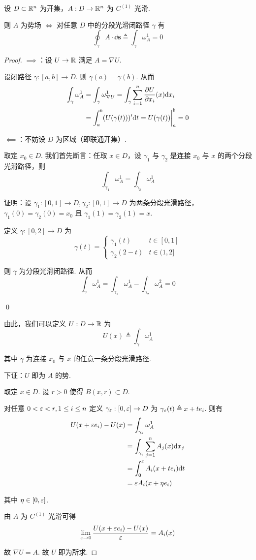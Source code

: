 \begin{property}
    设 $D\subset\mathbb{R}^n$ 为开集，$A:D\to\mathbb{R}^n$ 为 $C^{(1)}$ 光滑.

    则 $A$ 为势场 $\iff$ 对任意 $D$ 中的分段光滑闭路径 $\gamma$ 有
$$
\oint_\gamma A\cdot\dd\mathbf{s}\triangleq\int_\gamma\omega_A^1=0
$$
\end{property}
\begin{proof}
    $\implies$：设 $U\to\mathbb{R}$ 满足 $A=\nabla U$.
    
    设闭路径 $\gamma:[a,b]\to D$. 则 $\gamma(a)=\gamma(b)$. 从而
$$
\begin{aligned}
    \int_\gamma\omega_A^1&=\int_\gamma\omega_{\nabla U}^1=\int_\gamma\sum_{i=1}^n\frac{\partial{U}}{\partial{x_i}}(x)\mathrm{d} x_i\\
    &=\int_a^b(U(\gamma(t)))'\mathrm{d} t=U(\gamma(t))\biggr |_a^b=0
\end{aligned}
$$

    $\impliedby$：不妨设 $D$ 为区域（即联通开集）.

    取定 $x_0\in D$. 我们首先断言：任取 $x\in D$，设 $\gamma_1$ 与 $\gamma_2$ 是连接 $x_0$ 与 $x$ 的两个分段光滑路径，则
$$
\int_{\gamma_1}\omega_A^1=\int_{\gamma_2}\omega_A^1
$$

    证明：设 $\gamma_1:[0,1]\to D,\gamma_2:[0,1]\to D$ 为两条分段光滑路径，$\gamma_1(0)=\gamma_2(0)=x_0$ 且 $\gamma_1(1)=\gamma_2(1)=x$.

    定义 $\gamma:[0,2]\to D$ 为
$$
\gamma(t)=\begin{cases}
    \gamma_1(t) & t\in[0,1]\\
    \gamma_2(2-t) & t\in(1,2]
\end{cases}
$$


    则 $\gamma$ 为分段光滑闭路径. 从而
$$
\int_\gamma\omega_A^1=\int_{\gamma_1}\omega_A^1-\int_{\gamma_2}\omega_A^2=0
$$

    \qed

    由此，我们可以定义 $U:D\to\mathbb{R}$ 为
$$
U(x)\triangleq\int_\gamma\omega_A^1
$$

    其中 $\gamma$ 为连接 $x_0$ 与 $x$ 的任意一条分段光滑路径.

    下证：$U$ 即为 $A$ 的势.

    取定 $x\in D$. 设 $r>0$ 使得 $B(x,r)\subset D$.

    对任意 $0<\varepsilon<r,1\le i\le n$ 定义 $\gamma_\varepsilon:[0,\varepsilon]\to D$ 为 $\gamma_\varepsilon(t)\triangleq x+te_i$. 则有
$$
\begin{aligned}
    U(x+\varepsilon e_i)-U(x)&=\int_{\gamma_\varepsilon}\omega_A^1\\
    &=\int_{\gamma_\varepsilon}\sum_{j=1}^nA_j(x)\mathrm{d} x_j\\
    &=\int_0^\varepsilon A_i(x+te_i)\mathrm{d} t\\
    &=\varepsilon A_i(x+\eta e_i)
\end{aligned}
$$

    其中 $\eta\in[0,\varepsilon]$.


    由 $A$ 为 $C^{(1)}$ 光滑可得
$$
\lim_{\varepsilon\to 0}\frac{U(x+\varepsilon e_i)-U(x)}{\varepsilon}=A_i(x)
$$

    故 $\nabla U=A$. 故 $U$ 即为所求.
\end{proof}

